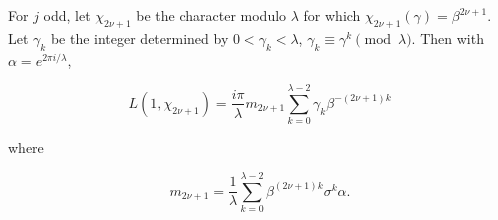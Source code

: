 For $j$ odd, let $\chi_{2\nu+1}$ be the character modulo $\lambda$ for which $\chi_{2\nu+1}(\gamma) = \beta^{2\nu+1}$. Let $\gamma_k$ be the integer determined by $0 < \gamma_k < \lambda$, $\gamma_k \equiv \gamma^k \pmod{\lambda}$. Then with $\alpha = e^{2\pi i/\lambda}$,

$$L(1, \chi_{2\nu+1}) = \frac{i\pi}{\lambda} m_{2\nu+1} \sum_{k=0}^{\lambda-2} \gamma_k \beta^{-(2\nu+1)k}$$

where

$$m_{2\nu+1} = \frac{1}{\lambda} \sum_{k=0}^{\lambda-2} \beta^{(2\nu+1)k} \sigma^k \alpha.$$
